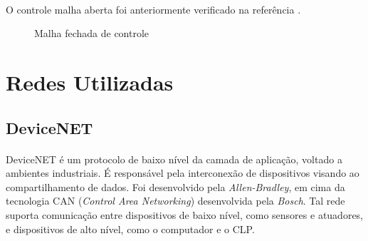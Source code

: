 \paragraph{} O controle malha aberta foi anteriormente verificado na referência \cite{redytton}.
\begin{figure}[!ht]
\centering
\caption{Malha fechada de controle\label{mfechadatikz}}
\end{figure}

\section{Redes Utilizadas}
\subsection{DeviceNET}
\paragraph{}DeviceNET é um protocolo de baixo nível da camada de aplicação, voltado a ambientes industriais. É responsável pela interconexão de dispositivos visando ao compartilhamento de dados. Foi desenvolvido pela \textit{Allen-Bradley}, em cima da tecnologia CAN (\textit{Control Area Networking}) desenvolvida pela \textit{Bosch}. Tal rede suporta comunicação entre dispositivos de baixo nível, como sensores e atuadores, e dispositivos de alto nível, como o computador e o CLP. 
